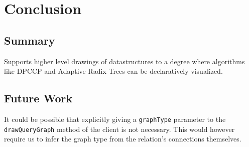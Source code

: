 \section{Conclusion}

\subsection{Summary}

Supports higher level drawings of datastructures to a degree where algorithms like DPCCP and Adaptive Radix Trees can be declaratively visualized.

\subsection{Future Work}

It could be possible that explicitly giving a \texttt{graphType} parameter to the \texttt{drawQueryGraph} method of the client is not necessary. This would however require us to infer the graph type from the relation's connections themselves.
